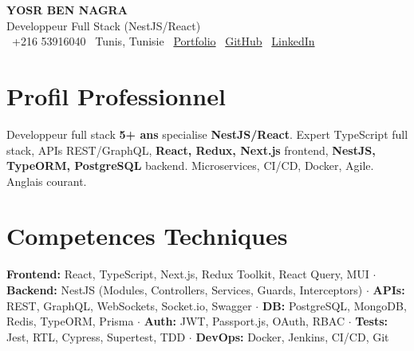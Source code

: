 \documentclass[10pt,a4paper]{article}
\begin{document}
\begin{center}
  {\Large\bfseries\color{primary} YOSR BEN NAGRA}\\[2pt]
  {\small\color{darkgray} Developpeur Full Stack (NestJS/React)}\\[3pt]
  {\footnotesize
    \faPhone\ +216 53916040 \quad
    \faMapMarker*\ Tunis, Tunisie \quad
    \faGlobe\ \href{https://portfolio-yosr.vercel.app/en}{Portfolio} \quad
    \faGithub\ \href{https://github.com/YosrBennagra}{GitHub} \quad
    \faLinkedin\ \href{https://www.linkedin.com/in/yosr-ben-nagra/}{LinkedIn}
  }
\end{center}

\section*{Profil Professionnel}
{\small
Developpeur full stack \textbf{5+ ans} specialise \textbf{NestJS/React}. Expert TypeScript full stack, APIs REST/GraphQL, \textbf{React, Redux, Next.js} frontend, \textbf{NestJS, TypeORM, PostgreSQL} backend. Microservices, CI/CD, Docker, Agile. Anglais courant.
}

\vspace{6pt}

\section*{Competences Techniques}
{\small
\textbf{Frontend:} React, TypeScript, Next.js, Redux Toolkit, React Query, MUI $\cdot$ \textbf{Backend:} NestJS (Modules, Controllers, Services, Guards, Interceptors) $\cdot$ \textbf{APIs:} REST, GraphQL, WebSockets, Socket.io, Swagger $\cdot$ \textbf{DB:} PostgreSQL, MongoDB, Redis, TypeORM, Prisma $\cdot$ \textbf{Auth:} JWT, Passport.js, OAuth, RBAC $\cdot$ \textbf{Tests:} Jest, RTL, Cypress, Supertest, TDD $\cdot$ \textbf{DevOps:} Docker, Jenkins, CI/CD, Git
}

\vspace{6pt}

\end{document}

